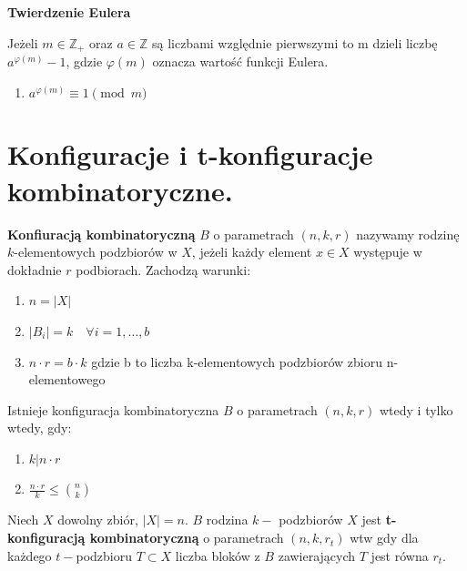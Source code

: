 \documentclass[12pt]{article}
\begin{document}
    \begin{definition}
        \textbf{Twierdzenie Eulera}

        Jeżeli $m \in \mathbb{Z_{+}}$ oraz $a \in \mathbb{Z}$ są liczbami względnie pierwszymi to m dzieli liczbę $a^{\varphi(m)} - 1$, gdzie $\varphi (m)$ oznacza wartość funkcji Eulera.

        \begin{enumerate}
            \item $a^{\varphi (m)} \equiv 1 \pmod m$\newline
        \end{enumerate}

    \end{definition}
    \newpage

    \section{Konfiguracje i t-konfiguracje kombinatoryczne.}

    \begin{definition}
        \textbf{Konfiuracją kombinatoryczną} $B$ o parametrach $(n,k,r)$ nazywamy rodzinę $k$-elementowych podzbiorów w $X$, jeżeli każdy element $x \in X$ występuje w dokładnie $r$ podbiorach. Zachodzą warunki:
        \begin{enumerate}
            \item $n = |X|$
            \item $|B_i|=k \quad \forall i=1, \dots, b$
            \item $n \cdot r = b \cdot k$ \quad gdzie b to liczba k-elementowych podzbiorów zbioru n-elementowego
        \end{enumerate}
    \end{definition}

    \begin{theorem}
        Istnieje konfiguracja kombinatoryczna $B$ o parametrach $(n, k, r)$ wtedy i tylko wtedy, gdy:
        \begin{enumerate}
            \item $k | n\cdot r$
            \item $\frac{n\cdot r}{k}\leq {n\choose k}$
        \end{enumerate}

    \end{theorem}

    \begin{definition}
        Niech $X$ dowolny zbiór, $|X| = n.$ $B$ rodzina $k-$ podzbiorów $X$ jest
        \textbf{t-konfiguracją kombinatoryczną} o parametrach $(n, k, r_t)$ wtw gdy dla
        każdego $t-$podzbioru $T \subset X$ liczba bloków z $B$ zawierających $T$ jest
        równa $r_t$.
    \end{definition}
\end{document}
